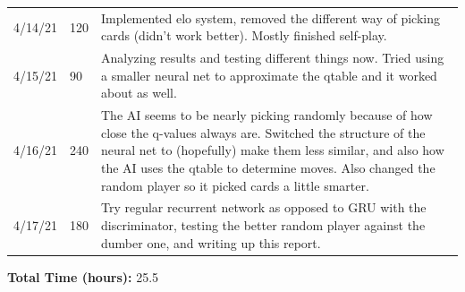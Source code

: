 \documentclass[]{article}
\begin{document}
\begin{table}[H]
\begin{tabular}{|P{0.1\textwidth}|P{0.15\textwidth}|p{0.75\textwidth}|}
		\\ 
		4/14/21 & 120                  & Implemented elo system, removed the different way of picking cards (didn't work better). Mostly finished self-play.        
		\\ 
		4/15/21 & 90                   & Analyzing results and testing different things now. Tried using a smaller neural net to approximate the qtable and it worked about as well.             
		\\ 
		4/16/21 & 240                  & The AI seems to be nearly picking randomly because of how close the q-values always are. Switched the structure of the neural net to (hopefully) make them less similar, and also how the AI uses the qtable to determine moves. Also changed the random player so it picked cards a little smarter. 
		\\ 
		4/17/21 & 180                  & Try regular recurrent network as opposed to GRU with the discriminator, testing the better random player against the dumber one, and writing up this report.          \\                                                                                                                
	\end{tabular}
\end{table}
\textbf{Total Time (hours):} 25.5
\end{document}
